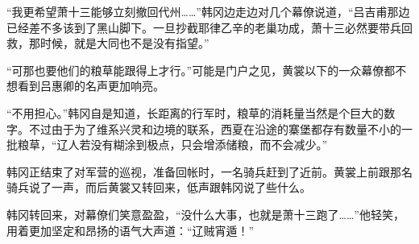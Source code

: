 “我更希望萧十三能够立刻撤回代州……”韩冈边走边对几个幕僚说道，“吕吉甫那边已经差不多该到了黑山脚下。一旦抄截耶律乙辛的老巢功成，萧十三必然要带兵回救，那时候，就是大同也不是没有指望。”

“可那也要他们的粮草能跟得上才行。”可能是门户之见，黄裳以下的一众幕僚都不想看到吕惠卿的名声更加响亮。

“不用担心。”韩冈自是知道，长距离的行军时，粮草的消耗量当然是个巨大的数字。不过由于为了维系兴灵和边境的联系，西夏在沿途的寨堡都存有数量不小的一批粮草，“辽人若没有糊涂到极点，只会增添储粮，而不会减少。”

韩冈正结束了对军营的巡视，准备回帐时，一名骑兵赶到了近前。黄裳上前跟那名骑兵说了一声，而后黄裳又转回来，低声跟韩冈说了些什么。

韩冈转回来，对幕僚们笑意盈盈，“没什么大事，也就是萧十三跑了……”他轻笑，用着更加坚定和昂扬的语气大声道：“辽贼宵遁！”
